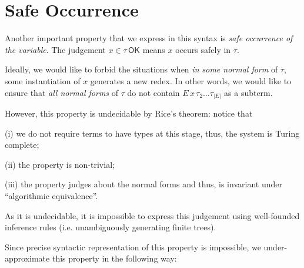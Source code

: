 \documentclass[a4,natbib=false]{article}
\newcommand{\bnfalt}{\;\;|\;\;}
\newcommand{\comptoval}[1]{\downarrow \hspace{-2pt} #1}
\newcommand{\sigmatype}[2]{\Sigma {#1}.\,#2}
\newcommand{\eqtype}[3]{\mathsf{eq}{#1}\,{#2}\,{#3}}
\newcommand{\narg}[1]{|{#1}|}
\newcommand{\judgeSok}[2]{{#1} \in {#2}\,\mathsf{OK}}
\begin{document}



\section{Safe Occurrence}

Another important property that we express in this syntax is \emph{safe
  occurrence of the variable}. The judgement $\judgeSok{x}{\tau}$ means $x$
occurs safely in $\tau$.

Ideally, we would like to forbid the situations when \emph{in some normal form}
of $\tau$, some instantiation of $x$ generates a new redex. In other words, we
would like to ensure that
\emph{all normal forms} of $\tau$ do not contain $E \, x \, \tau_2 \dots
\tau_{\narg{E}}$ as a subterm.

However, this property is undecidable by Rice's theorem: notice that
\begin{enumerate*}

\item[(i)] we do not require terms to have types at this stage, thus, the
  system is Turing complete;

\item[(ii)] the property is non-trivial;

\item[(iii)] the property judges about the normal forms and thus, is invariant
  under ``algorithmic equivalence''.
\end{enumerate*}
As it is undecidable, it is impossible to express this judgement using
well-founded inference rules (i.e. unambiguously generating finite trees).

Since precise syntactic representation of this property is impossible, we
under-approximate this property in the following way:
\end{document}
